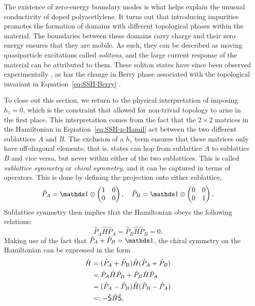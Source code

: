 The existence of zero-energy boundary modes is what helps explain the unusual conductivity of doped polyacetlylene. It turns out that introducing impurities promotes the formation of domains with different topological phases within the material. The boundaries between these domains carry charge and their zero energy ensures that they are mobile. As such, they can be described as moving quasiparticle excitations called \emph{solitons}, and the large current response of the material can be attributed to them. These soliton states have since been observed experimentally \cite{Meier_SSH-soliton}, as has the change in Berry phase associated with the topological invariant in Equation~\eqref{eq:SSH-Berry} \cite{Atala_SSH-Zak}.

To close out this section, we return to the physical interpretation of imposing $h_z = 0$, which is the constraint that allowed for non-trivial topology to arise in the first place. This interpretation comes from the fact that the $2\times2$ matrices in the Hamiltonian in Equation~\eqref{eq:SSH-n-Hamil} act between the two different sublattices $A$ and $B$. The exclusion of a $h_z$ term ensures that these matrices only have off-diagonal elements; that is, states can hop from sublattice $A$ to sublattice $B$ and vice versa, but never within either of the two sublattices. This is called \emph{sublattice symmetry} or \emph{chiral symmetry}, and it can be captured in terms of operators. This is done by defining the projection onto either sublattice,
\[
\hat{P}_A = \Id \otimes \begin{pmatrix}
	1 & 0 \\ 0 & 0
\end{pmatrix},\quad \hat{P}_B = \Id \otimes \begin{pmatrix}
	0 & 0 \\ 0 & 1
\end{pmatrix}.
\]
Sublattice symmetry then implies that the Hamiltonian obeys the following relations:
\[
\hat{P}_A\hat{H}\hat{P}_A = \hat{P}_B\hat{H}\hat{P}_B = 0.
\]
Making use of the fact that $\hat{P}_A +\hat{P}_B = \Id$, the chiral symmetry on the Hamiltonian can be expressed in the form
\begin{align*}
	\hat{H} &= (\hat{P}_A + \hat{P}_B)\hat{H}(\hat{P}_A + \hat{P}_B) \\
	&= \hat{P}_A\hat{H}\hat{P}_B + \hat{P}_B\hat{H}\hat{P}_A \\
	&= (\hat{P}_A - \hat{P}_B)\hat{H}(\hat{P}_B - \hat{P}_A) \\
	&=: -\hat{\mathsf{S}}\hat{H}\hat{\mathsf{S}},
\end{align*}
